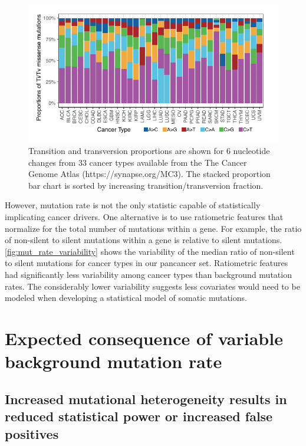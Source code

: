 \begin{figure}
  \centering
  \makeatletter
  \let\@currsize\normalsize
  \includegraphics[width=0.9\linewidth]{figures/chapter2/mutation_context.pdf}
  \caption[Transition and transversion proportions in cancer]{Transition and transversion proportions are shown for 6 nucleotide changes from 33 cancer types available from the The Cancer Genome Atlas (https://synapse.org/MC3). The stacked proportion bar chart is sorted by increasing transition/transversion fraction.}
  \label{fig:mutation_context}
\end{figure}

However, mutation rate is not the only statistic capable of statistically implicating cancer drivers. One alternative is to use ratiometric features that normalize for the total number of mutations within a gene. For example, the ratio of non-silent to silent mutations within a gene is relative to silent mutations. \autoref{fig:mut_rate_variability} shows the variability of the median ratio of non-silent to silent mutations for cancer types in our pancancer set. Ratiometric features had significantly less variability among cancer types than background mutation rates. The considerably lower variability suggests less covariates would need to be modeled when developing a statistical model of somatic mutations.

\section{Expected consequence of variable background mutation rate}

\subsection{Increased mutational heterogeneity results in reduced statistical power or increased false positives}

